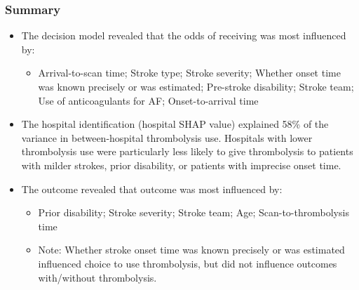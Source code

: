
\begin{frame}
\frametitle{Summary}
\small

\begin{itemize}
    \item The decision model revealed that the odds of receiving was most influenced by:
    
    \begin{itemize}
        \item Arrival-to-scan time; Stroke type; Stroke severity; Whether onset time was known precisely or was estimated; Pre-stroke disability; Stroke team; Use of anticoagulants for AF; Onset-to-arrival time
    \end{itemize}

\item The hospital identification (hospital SHAP value) explained 58\% of the variance in between-hospital thrombolysis use. Hospitals with lower thrombolysis use were particularly less likely to give thrombolysis to patients with milder strokes, prior disability, or patients with imprecise onset time.

\item The outcome revealed that outcome was most influenced by:
    
    \begin{itemize}
        \item Prior disability; Stroke severity; Stroke team; Age; Scan-to-thrombolysis time
        \item Note: Whether stroke onset time was known precisely or was estimated influenced choice to use thrombolysis, but did not influence outcomes with/without thrombolysis.
    \end{itemize}

\end{itemize}

\end{frame}
